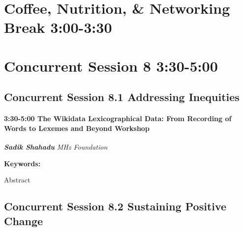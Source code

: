 \documentclass[
]{book}
\begin{document}
\hypertarget{coffee-nutrition-networking-break-300-330-1}{%
\section*{Coffee, Nutrition, \& Networking Break \textbar{} 3:00-3:30}\label{coffee-nutrition-networking-break-300-330-1}}

\hypertarget{concurrent-session-8-330-500}{%
\section*{Concurrent Session 8 \textbar{} 3:30-5:00}\label{concurrent-session-8-330-500}}

\hypertarget{concurrent-session-8.1-addressing-inequities}{%
\subsection*{Concurrent Session 8.1 \textbar{} Addressing Inequities}\label{concurrent-session-8.1-addressing-inequities}}

\begin{session}
\hypertarget{the-wikidata-lexicographical-data-from-recording-of-words-to-lexemes-and-beyond-workshop}{%
\paragraph*{\texorpdfstring{3:30-5:00 \textbar{} \textbf{The Wikidata
Lexicographical Data: From Recording of Words to Lexemes and Beyond}
\textbar{}
Workshop}{3:30-5:00 \textbar{} The Wikidata Lexicographical Data: From Recording of Words to Lexemes and Beyond \textbar{} Workshop}}\label{the-wikidata-lexicographical-data-from-recording-of-words-to-lexemes-and-beyond-workshop}}

\textbf{\emph{Sadik Shahadu}} \textbar{} \emph{MHz Foundation}

\textbf{Keywords:}

Abstract
\end{session}

\hypertarget{concurrent-session-8.2-sustaining-positive-change}{%
\subsection*{Concurrent Session 8.2 \textbar{} Sustaining Positive Change}\label{concurrent-session-8.2-sustaining-positive-change}}
\end{document}
